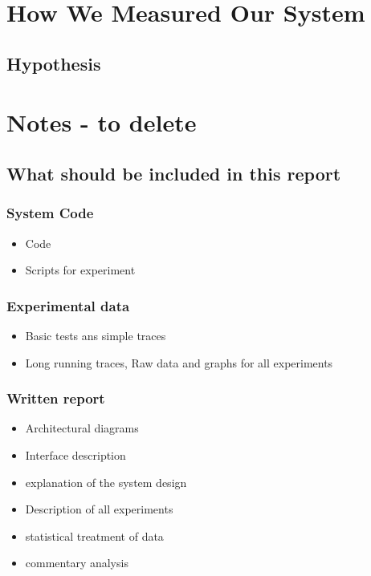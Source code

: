 \documentclass{article}
\begin{document}
\section{How We Measured Our System}

\subsection{Hypothesis}

\section{Notes - to delete}

\subsection{What should be included in this report }

\subsubsection{System Code}
\begin{itemize}
\item Code
\item Scripts for experiment
\end{itemize}

\subsubsection{Experimental data}
\begin{itemize}
\item Basic tests ans simple traces
\item Long running traces, Raw data and graphs for all experiments
\end{itemize}

\subsubsection{Written report}
\begin{itemize}
\item Architectural  diagrams
\item Interface description
\item explanation of the system design
\item Description of all experiments
\item statistical treatment of data
\item commentary analysis
\end{itemize}
\end{document}
